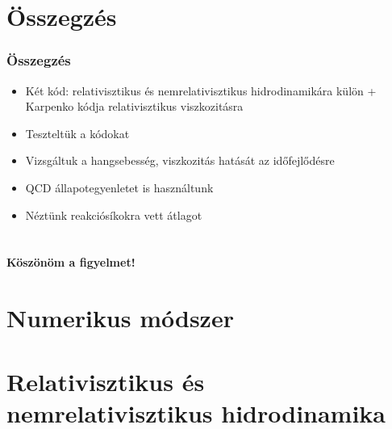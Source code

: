 \documentclass{beamer}
\begin{document}
\section{Összegzés}
\begin{frame}
\frametitle{Összegzés}
\begin{itemize}
\setlength{\itemsep}{16pt}
\item<1-> Két kód: relativisztikus és nemrelativisztikus hidrodinamikára külön + Karpenko kódja relativisztikus viszkozitásra
\item<1-> Teszteltük a kódokat
\item<1-> Vizsgáltuk a hangsebesség, viszkozitás hatását az időfejlődésre
\item<1-> QCD állapotegyenletet is használtunk
\item<1-> Néztünk reakciósíkokra vett átlagot
\end{itemize}
\end{frame}

\section{}
\begin{frame}[noframenumbering]
\begin{center}
\textbf{\huge{Köszönöm a figyelmet!}}
\end{center}
\end{frame}











\section{Numerikus módszer}





\section{Relativisztikus és nemrelativisztikus hidrodinamika}
\end{document}
